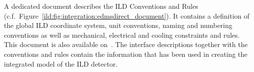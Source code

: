 A dedicated document describes the ILD Conventions and Rules (c.f.~Figure~\ref{ild:fig:integration:edmsdirect_document}). It contains a definition of the global ILD coordinate system, unit conventions, naming and numbering conventions as well as mechanical, electrical and cooling constraints and rules. This document is also available on~\cite{ild:bib:edmsdirect}. 
The interface descriptions together with the conventions and rules contain the information that has been used in creating the integrated model of the ILD detector.